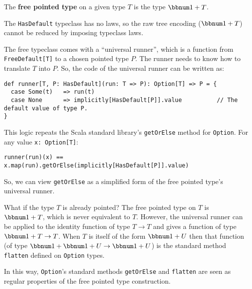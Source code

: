 The \textbf{free pointed type} on a given
type $T$ is the type $\bbnum 1+T$.

The \lstinline!HasDefault!
typeclass has no laws, so the raw tree encoding ($\bbnum 1+T$) cannot
be reduced by imposing typeclass laws. 

The free typeclass comes with a \textsf{``}universal runner\textsf{''}, which is a
function from \lstinline!FreeDefault[T]!
to a chosen pointed type $P$. The runner needs to know how to translate
$T$ into $P$. So, the code of the universal runner can be written
as:
\begin{lstlisting}
def runner[T, P: HasDefault](run: T => P): Option[T] => P = {
  case Some(t)   => run(t)
  case None      => implicitly[HasDefault[P]].value          // The default value of type P.
}
\end{lstlisting}
This logic repeats the Scala standard library\textsf{'}s \lstinline!getOrElse!
method for \lstinline!Option!.
For any value \lstinline!x: Option[T]!:
\begin{lstlisting}
runner(run)(x) == x.map(run).getOrElse(implicitly[HasDefault[P]].value)
\end{lstlisting}
So, we can view \lstinline!getOrElse!
as a simplified form of the free pointed type\textsf{'}s universal runner.

What if the type $T$ is already pointed? The free pointed type on
$T$ is $\bbnum 1+T$, which is never equivalent to $T$. However,
the universal runner can be applied to the identity function of type
$T\rightarrow T$ and gives a function of type $\bbnum 1+T\rightarrow T$.
When $T$ is itself of the form $\bbnum 1+U$ then that function (of
type $\bbnum 1+\bbnum 1+U\rightarrow\bbnum 1+U$) is the standard
method \lstinline!flatten!
defined on \lstinline!Option!
types.

In this way, \lstinline!Option!\textsf{'}s
standard methods \lstinline!getOrElse!
and \lstinline!flatten!
are seen as regular properties of the free pointed type construction.

